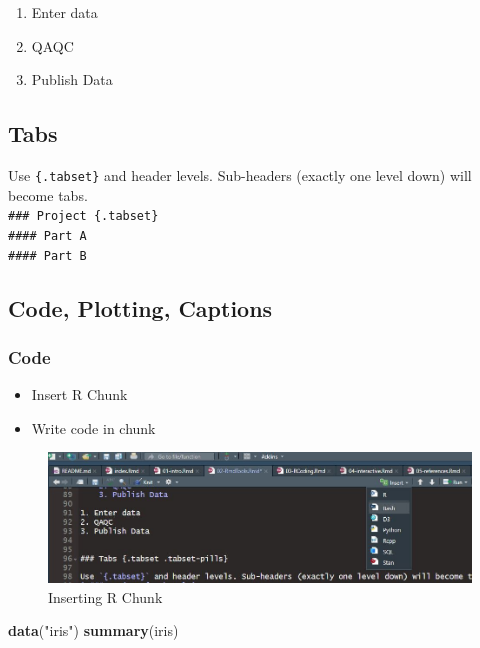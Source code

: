 \documentclass[
]{book}
\newenvironment{Shaded}{\begin{snugshade}}{\end{snugshade}}
\newcommand{\KeywordTok}[1]{\textcolor[rgb]{0.13,0.29,0.53}{\textbf{#1}}}
\newcommand{\NormalTok}[1]{#1}
\newcommand{\StringTok}[1]{\textcolor[rgb]{0.31,0.60,0.02}{#1}}
\providecommand{\tightlist}{%
  \setlength{\itemsep}{0pt}\setlength{\parskip}{0pt}}
\begin{document}
\begin{enumerate}
\def\labelenumi{\arabic{enumi}.}
\tightlist
\item
  Enter data
\item
  QAQC
\item
  Publish Data
\end{enumerate}

\hypertarget{tabs}{%
\subsection{Tabs}\label{tabs}}

Use \texttt{\{.tabset\}} and header levels. Sub-headers (exactly one level down) will become tabs.\\
\texttt{\#\#\#\ Project\ \{.tabset\}}~\\
\texttt{\#\#\#\#\ Part\ A}~\\
\texttt{\#\#\#\#\ Part\ B}

\hypertarget{code-plotting-captions}{%
\subsection{Code, Plotting, Captions}\label{code-plotting-captions}}

\hypertarget{code}{%
\subsubsection{Code}\label{code}}

\begin{itemize}
\tightlist
\item
  Insert R Chunk\\
\item
  Write code in chunk
\end{itemize}

\begin{figure}
\centering
\includegraphics{Rchunk.jpg}
\caption{Inserting R Chunk}
\end{figure}

\begin{Shaded}
\begin{Highlighting}[]
\KeywordTok{data}\NormalTok{(}\StringTok{"iris"}\NormalTok{)}
\KeywordTok{summary}\NormalTok{(iris)}
\end{Highlighting}
\end{Shaded}
\end{document}
